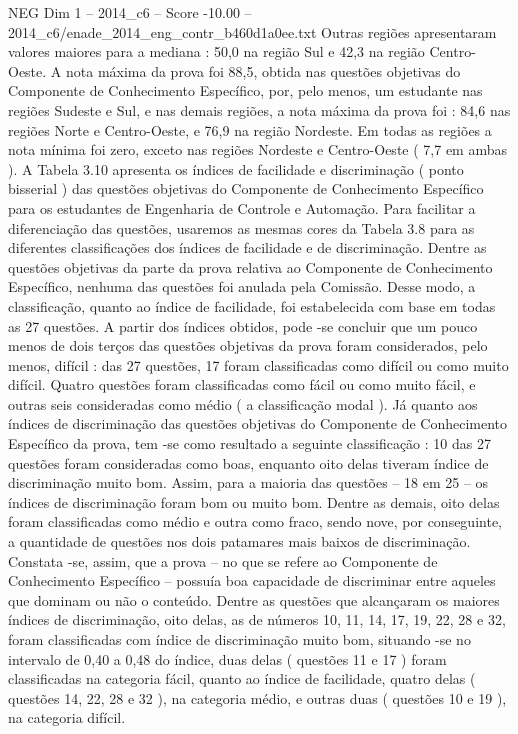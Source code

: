 \begin{textsample}{NEG Dim 1 – 2014\_c6 – Score -10.00 – 2014\_c6/enade\_2014\_eng\_contr\_b460d1a0ee.txt}
Outras regiões apresentaram valores maiores para a mediana : 50,0 na região Sul e 42,3 na região Centro-Oeste.
A nota máxima da prova foi 88,5, obtida nas questões objetivas do Componente de Conhecimento Específico, por, pelo menos, um estudante nas regiões Sudeste e Sul, e nas demais regiões, a nota máxima da prova foi : 84,6 nas regiões Norte e Centro-Oeste, e 76,9 na região Nordeste.
Em todas as regiões a nota mínima foi zero, exceto nas regiões Nordeste e Centro-Oeste ( 7,7 em ambas ).
A Tabela 3.10 apresenta os índices de facilidade e discriminação ( ponto bisserial ) das questões objetivas do Componente de Conhecimento Específico para os estudantes de Engenharia de Controle e Automação.
Para facilitar a diferenciação das questões, usaremos as mesmas cores da Tabela 3.8 para as diferentes classificações dos índices de facilidade e de discriminação.
Dentre as questões objetivas da parte da prova relativa ao Componente de Conhecimento Específico, nenhuma das questões foi anulada pela Comissão.
Desse modo, a classificação, quanto ao índice de facilidade, foi estabelecida com base em todas as 27 questões.
A partir dos índices obtidos, pode -se concluir que um pouco menos de dois terços das questões objetivas da prova foram considerados, pelo menos, difícil : das 27 questões, 17 foram classificadas como difícil ou como muito difícil.
Quatro questões foram classificadas como fácil ou como muito fácil, e outras seis consideradas como médio ( a classificação modal ).
Já quanto aos índices de discriminação das questões objetivas do Componente de Conhecimento Específico da prova, tem -se como resultado a seguinte classificação : 10 das 27 questões foram consideradas como boas, enquanto oito delas tiveram índice de discriminação muito bom.
Assim, para a maioria das questões – 18 em 25 – os índices de discriminação foram bom ou muito bom.
Dentre as demais, oito delas foram classificadas como médio e outra como fraco, sendo nove, por conseguinte, a quantidade de questões nos dois patamares mais baixos de discriminação.
Constata -se, assim, que a prova – no que se refere ao Componente de Conhecimento Específico – possuía boa capacidade de discriminar entre aqueles que dominam ou não o conteúdo.
Dentre as questões que alcançaram os maiores índices de discriminação, oito delas, as de números 10, 11, 14, 17, 19, 22, 28 e 32, foram classificadas com índice de discriminação muito bom, situando -se no intervalo de 0,40 a 0,48 do índice, duas delas ( questões 11 e 17 ) foram classificadas na categoria fácil, quanto ao índice de facilidade, quatro delas ( questões 14, 22, 28 e 32 ), na categoria médio, e outras duas ( questões 10 e 19 ), na categoria difícil.

\end{textsample}
